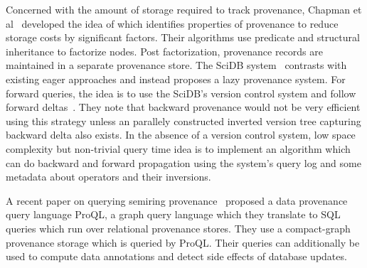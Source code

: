 Concerned with the amount of storage required to track provenance, Chapman et al~\cite{chapman_provstorage} developed the idea of  which identifies properties of provenance to reduce storage costs by significant factors. Their algorithms use predicate and structural inheritance to factorize nodes. Post factorization, provenance records are maintained in a separate provenance store. The SciDB system~\cite{cudré2009demonstration} contrasts with existing eager approaches and instead proposes a lazy provenance system. For forward queries, the idea is to use the SciDB's version control system and follow forward deltas~\cite{oo_versioning}. They note that backward provenance would not be very efficient using this strategy unless an parallely constructed inverted version tree capturing backward delta also exists. In the absence of a version control system, low space complexity but non-trivial query time idea is to implement an algorithm which can do backward and forward propagation using the system's query log and some metadata about operators and their inversions.

A recent paper on querying semiring provenance~\cite{queryprov_sig2010} proposed a data provenance query language ProQL, a graph query language which they translate to SQL queries which run over relational provenance stores. They use a compact-graph provenance storage which is queried by ProQL. Their queries can additionally be used to compute data annotations and detect side effects of database updates.